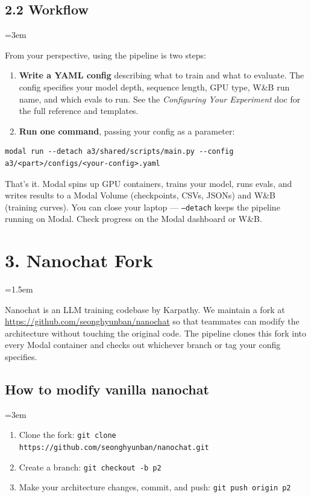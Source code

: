 \documentclass[9pt]{extarticle}
\begin{document}
\subsection*{2.2 Workflow}
\leftskip=3em

From your perspective, using the pipeline is two steps:

\begin{enumerate}[nosep]
  \item \textbf{Write a YAML config} describing what to train and what to evaluate. The config specifies your model depth, sequence length, GPU type, W\&B run name, and which evals to run. See the \textit{Configuring Your Experiment} doc for the full reference and templates.
  \item \textbf{Run one command}, passing your config as a parameter:
\end{enumerate}

\begin{lstlisting}
modal run --detach a3/shared/scripts/main.py --config a3/<part>/configs/<your-config>.yaml
\end{lstlisting}

That's it. Modal spins up GPU containers, trains your model, runs evals, and writes results to a Modal Volume (checkpoints, CSVs, JSONs) and W\&B (training curves). You can close your laptop --- \texttt{--detach} keeps the pipeline running on Modal. Check progress on the Modal dashboard or W\&B.

\leftskip=0pt
\section*{3. Nanochat Fork}
\leftskip=1.5em

Nanochat is an LLM training codebase by Karpathy. We maintain a fork at \url{https://github.com/seonghyunban/nanochat} so that teammates can modify the architecture without touching the original code. The pipeline clones this fork into every Modal container and checks out whichever branch or tag your config specifies.

\subsection*{How to modify vanilla nanochat}
\leftskip=3em

\begin{enumerate}[nosep]
  \item Clone the fork: \texttt{git clone https://github.com/seonghyunban/nanochat.git}
  \item Create a branch: \texttt{git checkout -b p2}
  \item Make your architecture changes, commit, and push: \texttt{git push origin p2}
\end{enumerate}
\end{document}

